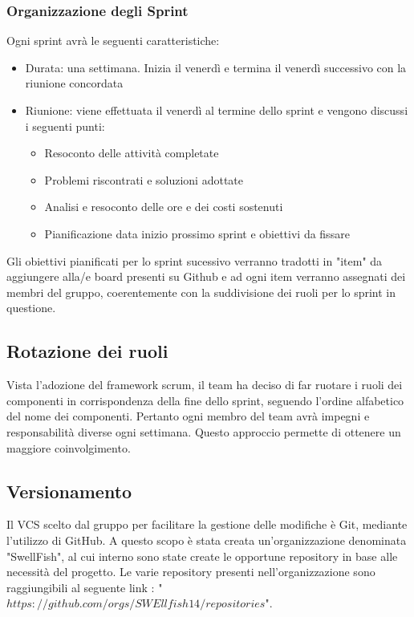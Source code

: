 \documentclass[12pt]{article}
\begin{document}
\subsubsection{Organizzazione degli Sprint}
Ogni sprint avrà le seguenti caratteristiche:
\begin{itemize}
    \item Durata: una settimana. Inizia il venerdì e termina il venerdì successivo con la riunione concordata
    \item Riunione: viene effettuata il venerdì al termine dello sprint e vengono discussi i seguenti punti:
    \begin{itemize}
        \item Resoconto delle attività completate
        \item Problemi riscontrati e soluzioni adottate
        \item Analisi e resoconto delle ore e dei costi sostenuti
        \item Pianificazione data inizio prossimo sprint e obiettivi da fissare
    \end{itemize}
\end{itemize}
Gli obiettivi pianificati per lo sprint sucessivo verranno tradotti in "item" da aggiungere alla/e board presenti su Github e ad ogni item verranno assegnati dei membri del gruppo, coerentemente con la suddivisione dei ruoli per lo sprint in questione.
    

\subsection{Rotazione dei ruoli}
Vista l'adozione del framework scrum, il team ha deciso di far ruotare i ruoli dei componenti in corrispondenza della fine dello sprint, seguendo l'ordine alfabetico del nome dei componenti.
Pertanto ogni membro del team avrà impegni e responsabilità diverse ogni settimana. Questo approccio permette di ottenere un maggiore coinvolgimento.

\subsection{Versionamento}
Il VCS scelto dal gruppo per facilitare la gestione delle modifiche è Git, mediante l'utilizzo di GitHub.
A questo scopo è stata creata un'organizzazione denominata "SwellFish", al cui interno sono state create le opportune repository in base alle necessità del progetto.
Le varie repository presenti nell'organizzazione sono raggiungibili al seguente link : "$https://github.com/orgs/SWEllfish14/repositories$".
\end{document}
